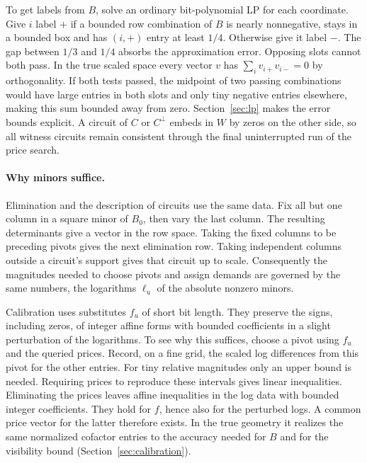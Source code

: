 To get labels from \(B\), solve an ordinary bit-polynomial LP for each
coordinate. Give \(i\) label \(+\) if a bounded row combination of
\(B\) is nearly nonnegative, stays in a bounded box and has
\((i,+)\) entry at least \(1/4\). Otherwise give it label \(-\).
The gap between \(1/3\) and \(1/4\) absorbs the approximation error.
Opposing slots cannot both pass. In the true scaled space every
vector \(v\) has \(\sum_i v_{i+}v_{i-}=0\) by orthogonality. If both
tests passed, the midpoint of two passing combinations would have
large entries in both slots and only tiny negative entries elsewhere,
making this sum bounded away from zero. Section~\ref{sec:lp} makes the
error bounds explicit. A circuit of \(C\) or \(C^\perp\) embeds in
\(W\) by zeros on the other side, so all witness circuits remain
consistent through the final uninterrupted run of the price search.

\paragraph{Why minors suffice.}
Elimination and the description of circuits use the same data.
Fix all but one column in a square minor of \(B_0\), then vary the
last column. The resulting determinants give a vector in the row
space. Taking the fixed columns to be preceding pivots gives the
next elimination row. Taking independent columns outside a circuit's
support gives that circuit up to scale. Consequently the magnitudes
needed to choose pivots and assign demands are governed by the same
numbers, the logarithms \(\ell_u\) of the absolute nonzero minors.

Calibration uses substitutes \(f_u\) of short bit length. They preserve
the signs, including zeros, of integer affine forms with bounded
coefficients in a slight perturbation of the logarithms. To see why
this suffices, choose a pivot using \(f_u\) and the queried prices.
Record, on a fine grid, the scaled log differences from this pivot
for the other entries. For tiny relative magnitudes only an upper
bound is needed. Requiring prices to reproduce these intervals gives
linear inequalities. Eliminating the prices leaves affine
inequalities in the log data with bounded integer coefficients.
They hold for \(f\), hence also for the perturbed logs. A common
price vector for the latter therefore exists. In the true geometry
it realizes the same normalized cofactor entries to the accuracy
needed for \(B\) and for the visibility bound
(Section~\ref{sec:calibration}).

